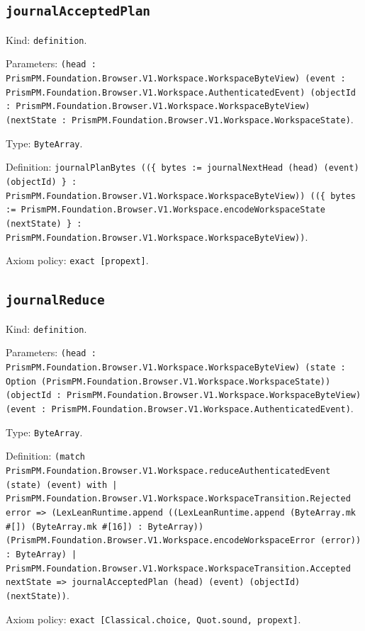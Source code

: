 \documentclass[11pt]{article}
\begin{document}
\subsection*{\texttt{journalAcceptedPlan}}
\noindent Kind: \texttt{definition}.\par
\noindent Parameters: \texttt{(head : PrismPM.Foundation.Browser.V1.Workspace.WorkspaceByteView) (event : PrismPM.Foundation.Browser.V1.Workspace.AuthenticatedEvent) (objectId : PrismPM.Foundation.Browser.V1.Workspace.WorkspaceByteView) (nextState : PrismPM.Foundation.Browser.V1.Workspace.WorkspaceState)}.\par
\noindent Type: \texttt{ByteArray}.\par
\noindent Definition: \texttt{journalPlanBytes ((\{ bytes := journalNextHead (head) (event) (objectId) \} : PrismPM.Foundation.Browser.V1.Workspace.WorkspaceByteView)) ((\{ bytes := PrismPM.Foundation.Browser.V1.Workspace.encodeWorkspaceState (nextState) \} : PrismPM.Foundation.Browser.V1.Workspace.WorkspaceByteView))}.\par
\noindent Axiom policy: \texttt{exact [propext]}.\par
\subsection*{\texttt{journalReduce}}
\noindent Kind: \texttt{definition}.\par
\noindent Parameters: \texttt{(head : PrismPM.Foundation.Browser.V1.Workspace.WorkspaceByteView) (state : Option (PrismPM.Foundation.Browser.V1.Workspace.WorkspaceState)) (objectId : PrismPM.Foundation.Browser.V1.Workspace.WorkspaceByteView) (event : PrismPM.Foundation.Browser.V1.Workspace.AuthenticatedEvent)}.\par
\noindent Type: \texttt{ByteArray}.\par
\noindent Definition: \texttt{(match PrismPM.Foundation.Browser.V1.Workspace.reduceAuthenticatedEvent (state) (event) with | PrismPM.Foundation.Browser.V1.Workspace.WorkspaceTransition.Rejected error => (LexLeanRuntime.append ((LexLeanRuntime.append (ByteArray.mk \#[]) (ByteArray.mk \#[16]) : ByteArray)) (PrismPM.Foundation.Browser.V1.Workspace.encodeWorkspaceError (error)) : ByteArray) | PrismPM.Foundation.Browser.V1.Workspace.WorkspaceTransition.Accepted nextState => journalAcceptedPlan (head) (event) (objectId) (nextState))}.\par
\noindent Axiom policy: \texttt{exact [Classical.choice, Quot.sound, propext]}.\par
\end{document}
